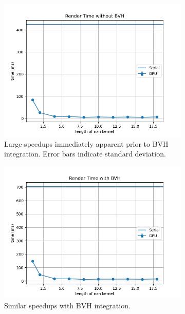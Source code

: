 \documentclass[11pt]{article}
\begin{document}
\begin{figure}
    \begin{subfigure}[b]{0.3\textwidth}
    \centering
    \includegraphics[scale=.3]{world1b1.png}
    \caption{Large speedups immediately apparent prior to BVH integration. Error bars indicate standard deviation.}
    \label{fig:no_bvh}
    \end{subfigure}
    \begin{subfigure}[b]{0.3\textwidth}
    \centering
    \includegraphics[scale=.3]{world8b8.png}
    \caption{Similar speedups with BVH integration.}
    \label{figure:bvh}
    \end{subfigure}
    \begin{subfigure}[b]{0.3\textwidth}

\end{subfigure}
\end{figure}
\end{document}
